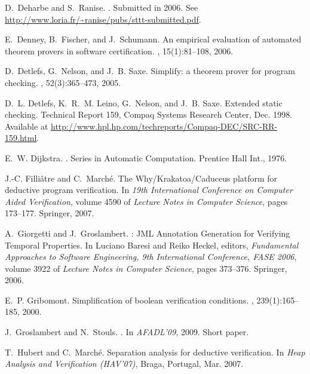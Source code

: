 \documentclass{acm_proc_article-sp}
\theoremstyle{nonumberplain}
\begin{document}
\begin{thebibliography}{10}
D.~Deharbe and S.~Ranise.
.
\newblock Submitted in 2006. See
  \url{http://www.loria.fr/~ranise/pubs/sttt-submitted.pdf}.

E.~Denney, B.~Fischer, and J.~Schumann.
\newblock An empirical evaluation of automated theorem provers in software
  certification.
,
  15(1):81--108, 2006.

D.~Detlefs, G.~Nelson, and J.~B. Saxe.
\newblock Simplify: a theorem prover for program checking.
, 52(3):365--473, 2005.

D.~L. Detlefs, K.~R.~M. Leino, G.~Nelson, and J.~B. Saxe.
\newblock Extended static checking.
\newblock Technical Report 159, Compaq Systems Research Center, Dec. 1998.
\newblock Available at
\url{http://www.hpl.hp.com/techreports/Compaq-DEC/SRC-RR-159.html}.

E.~W. Dijkstra.
.
\newblock Series in Automatic Computation. Prentice Hall Int., 1976.

J.-C. Filli\^atre and C.~March\'e.
\newblock The {Why/Krakatoa/Caduceus} platform for deductive program
  verification.
\newblock In {\em {19th International Conference on Computer Aided
  Verification}}, volume 4590 of
\balancecolumns  
   {\em Lecture Notes in Computer Science}, pages
  173--177.
   Springer, 2007.

A.~Giorgetti and J.~Groslambert.
: {JML} {A}nnotation {G}eneration for {V}erifying {T}emporal
  {P}roperties.
\newblock In {L}uciano {B}aresi and {R}eiko {H}eckel, 
editors, {\em   {F}undamental {A}pproaches to {S}oftware
   {E}ngineering, 9th {I}nternational  {C}onference, {FASE}
   2006}, volume 3922 of {\em {L}ecture {N}otes in
  {C}omputer {S}cience}, pages 373--376. {S}pringer, 2006.

E.~P. Gribomont.
\newblock Simplification of boolean verification conditions.
, 239(1):165--185, 2000.

J.~Groslambert and N.~Stouls.
.
\newblock In {\em {AFADL'09}}, 2009.
\newblock Short paper.

T.~Hubert and C.~March\'e.
\newblock Separation analysis for deductive verification.
\newblock In {\em Heap Analysis and Verification (HAV'07)}, Braga, Portugal,
  Mar. 2007.


\end{thebibliography}
\end{document}
